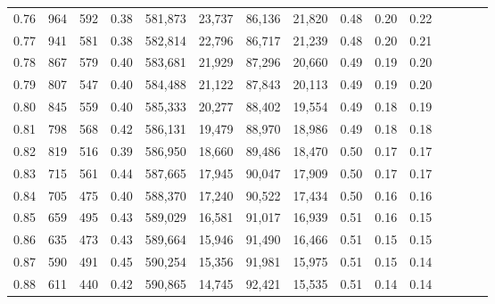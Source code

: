 \begin{tabular}{rrrcrrrrrrrrrrr}
0.76 &     964 &     592 &                                       0.38 &  581,873 &   23,737 &   86,136 &   21,820 &  0.48 &  0.20 &                         0.22 \\
0.77 &     941 &     581 &                                       0.38 &  582,814 &   22,796 &   86,717 &   21,239 &  0.48 &  0.20 &                         0.21 \\
0.78 &     867 &     579 &                                       0.40 &  583,681 &   21,929 &   87,296 &   20,660 &  0.49 &  0.19 &                         0.20 \\
0.79 &     807 &     547 &                                       0.40 &  584,488 &   21,122 &   87,843 &   20,113 &  0.49 &  0.19 &                         0.20 \\
0.80 &     845 &     559 &                                       0.40 &  585,333 &   20,277 &   88,402 &   19,554 &  0.49 &  0.18 &                         0.19 \\
0.81 &     798 &     568 &                                       0.42 &  586,131 &   19,479 &   88,970 &   18,986 &  0.49 &  0.18 &                         0.18 \\
0.82 &     819 &     516 &                                       0.39 &  586,950 &   18,660 &   89,486 &   18,470 &  0.50 &  0.17 &                         0.17 \\
0.83 &     715 &     561 &                                       0.44 &  587,665 &   17,945 &   90,047 &   17,909 &  0.50 &  0.17 &                         0.17 \\
0.84 &     705 &     475 &                                       0.40 &  588,370 &   17,240 &   90,522 &   17,434 &  0.50 &  0.16 &                         0.16 \\
0.85 &     659 &     495 &                                       0.43 &  589,029 &   16,581 &   91,017 &   16,939 &  0.51 &  0.16 &                         0.15 \\
0.86 &     635 &     473 &                                       0.43 &  589,664 &   15,946 &   91,490 &   16,466 &  0.51 &  0.15 &                         0.15 \\
0.87 &     590 &     491 &                                       0.45 &  590,254 &   15,356 &   91,981 &   15,975 &  0.51 &  0.15 &                         0.14 \\
0.88 &     611 &     440 &                                       0.42 &  590,865 &   14,745 &   92,421 &   15,535 &  0.51 &  0.14 &                         0.14 \\

\end{tabular}
